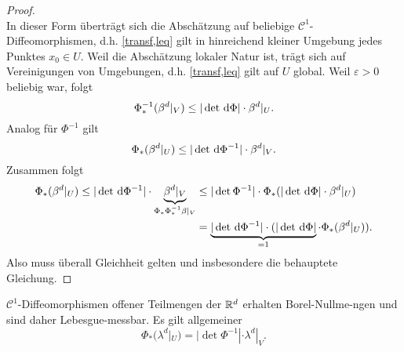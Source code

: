\begin{satz}
\begin{proof}
\begin{equation}
\end{equation}
In dieser Form überträgt sich die Abschätzung auf beliebige $\mathcal{C}^1$-Diffeomorphismen, d.h. \eqref{transf,leq} gilt in hinreichend kleiner Umgebung jedes Punktes $x_0\in U$. Weil die Abschätzung lokaler Natur ist, trägt sich auf Vereinigungen von Umgebungen, d.h. \eqref{transf,leq} gilt auf $U$ global. Weil $\varepsilon>0$ beliebig war, folgt
$$\Phi^{-1}_*(\beta^d|_V)\leq |\det \, \mathrm{d} \Phi| \cdot \beta^d|_U.
$$
Analog für $\Phi^{-1}$ gilt
$$\Phi_*(\beta^d|_U)\leq |\det \, \mathrm{d} \Phi^{-1}| \cdot \beta^d|_V.$$
Zusammen folgt
\begin{equation*}
\begin{split}
\Phi_*(\beta^d|_U)\leq |\det \, \mathrm{d} \Phi^{-1}| \cdot \underbrace{\beta^d|_V}_{\Phi_*\Phi^{-1}_*\beta|_V} &\leq |\det \Phi^{-1}|\cdot \Phi_*(|\det \, \mathrm{d} \Phi| \cdot \beta^d|_U) \\
&= \underbrace{|\det \, \mathrm{d}\Phi^{-1}|\cdot (|\det \, \mathrm{d} \Phi|}_{=1}\cdot \Phi_*(\beta^d|_U)).
\end{split}
\end{equation*}
Also muss überall Gleichheit gelten und insbesondere die behauptete Gleichung.
\end{proof}
\end{satz}

\begin{korollar}
\begin{mdframed}
$\mathcal{C}^1$-Diffeomorphismen offener Teilmengen der $\mathbb{R}^d$ erhalten Borel-Nullme-ngen und sind daher Lebesgue-messbar. Es gilt allgemeiner
\begin{equation}
\Phi_*(\lambda^d|_U)=|\det \Phi^{-1}|\cdot \lambda^d|_V.
\end{equation}
\end{mdframed}
\end{korollar}



%

